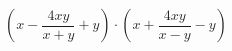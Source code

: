 \begin{ex}[type=expression]
	\begin{condition}
		\( \left( x-\dfrac{4xy}{x+y}+y \right) \cdot\left( x+\dfrac{4xy}{x-y}-y \right)\)
	\end{condition}
\end{ex}